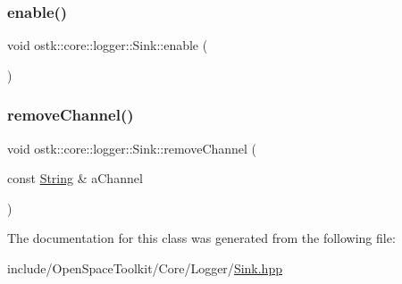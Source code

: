 \subsubsection{\texorpdfstring{enable()}{enable()}}
{\footnotesize\ttfamily void ostk\+::core\+::logger\+::\+Sink\+::enable (\begin{DoxyParamCaption}{ }\end{DoxyParamCaption})}

\mbox{\label{classostk_1_1core_1_1logger_1_1_sink_ac11d2e63d7643cdbf8a24718ce2dd216}} 
\subsubsection{\texorpdfstring{remove\+Channel()}{removeChannel()}}
{\footnotesize\ttfamily void ostk\+::core\+::logger\+::\+Sink\+::remove\+Channel (\begin{DoxyParamCaption}\item[{const \hyperlink{classostk_1_1core_1_1types_1_1_string}{String} \&}]{a\+Channel }\end{DoxyParamCaption})}



The documentation for this class was generated from the following file\+:\begin{DoxyCompactItemize}
\item 
include/\+Open\+Space\+Toolkit/\+Core/\+Logger/\hyperlink{_sink_8hpp}{Sink.\+hpp}\end{DoxyCompactItemize}
